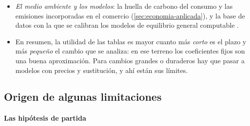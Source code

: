 \documentclass[11pt]{article}
\begin{document}
\begin{itemize}
  \begin{itemize}
  \item Tras la pandemia y la guerra de Ucrania, la autonomía estratégica ha devuelto el interés por medir dependencias: las tablas multirregionales dicen cuánto valor añadido de cada país hay en lo que se produce y se consume, no solo a quién se compra directamente .
  \item Con la \emph{extracción hipotética} (anexo~\ref{anexo:extensiones}) se estima cuánto caería la producción si faltara una rama o un proveedor, como en los cortes de suministro de semiconductores de 2021.
  \end{itemize}
\item \emph{El medio ambiente y los modelos}: la huella de carbono del consumo y las emisiones incorporadas en el comercio (\ref{sec:economia-aplicada}), y la base de datos con la que se calibran los modelos de equilibrio general computable .
\item En resumen, la utilidad de las tablas es mayor cuanto más \emph{corto} es el plazo y más \emph{pequeño} el cambio que se analiza: en ese terreno los coeficientes fijos son una buena aproximación. Para cambios grandes o duraderos hay que pasar a modelos con precios y sustitución, y ahí están sus límites.
\end{itemize}

\subsection{Origen de algunas limitaciones}\label{sec:limitaciones}

\paragraph{Las hipótesis de partida}
\end{document}
